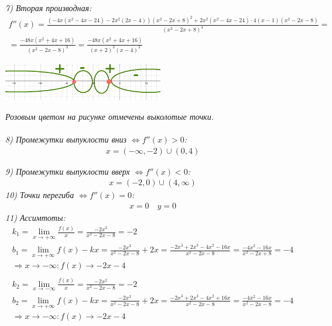 \documentclass[a4paper,11pt]{article}
\begin{document}
\noindent \textsl{7) Вторая производная:}
\begin{gather*}	
f''(x) = \frac{(-4x(x^2 - 4x - 24) - 2x^2(2x - 4))(x^2 - 2x + 8)^2 + 2x^2(x^2 - 4x - 24) \cdot 4(x - 1)(x^2 - 2x - 8) }{(x^2 - 2x + 8)^4} = \\
= \frac{-48x(x^2 + 4x + 16)}{(x^2 - 2x - 8)^3} = \frac{-48x(x^2 + 4x + 16)}{(x + 2)^3(x - 4)^3}
\end{gather*}

\begin{center}
	\includegraphics[width = 70mm]{images/723.png}
\end{center}
\noindent \textit{Розовым цветом на рисунке отмечены выколотые точки.} \\ \\
\noindent \textsl{8) Промежутки  выпуклости вниз $\Longleftrightarrow f''(x) > 0 $:}
\begin{gather*}
x = (-\infty, -2) \cup (0, 4)
\end{gather*}

\noindent \textsl{9) Промежутки  выпуклости вверх $\Longleftrightarrow f''(x) < 0 $:}
\begin{gather*}
 x = (-2, 0) \cup (4, \infty)
\end{gather*}
\noindent \textsl{10) Точки перегиба   $\Longleftrightarrow f''(x) = 0 $:}
\begin{align*}
x = 0 \quad y = 0
\end{align*}
\noindent \textsl{11) Ассимтоты:}
\begin{gather*}
k_1 = \lim_{x \to +\infty} \frac{f(x)}{x} = \frac{-2x^2}{x^2 - 2x - 8} = -2 \\
b_1 = \lim_{x \to +\infty} f(x) - kx = \frac{-2x^3}{x^2 - 2x - 8} + 2x = 
\frac{-2x^3 + 2x^3 - 4x^2 - 16x}{x^2 - 2x - 8} = \frac{- 4x^2 - 16x}{x^2 - 2x + 8} = -4 \\
\Rightarrow x \to -\infty: f(x) \to -2x - 4 \\ \\
k_2 = \lim_{x \to -\infty} \frac{f(x)}{x} = \frac{-2x^2}{x^2 - 2x - 8} = -2 \\
b_2 = \lim_{x \to +\infty} f(x) - kx = \frac{-2x^3}{x^2 - 2x - 8} + 2x = 
\frac{-2x^3 + 2x^3 - 4x^2 + 16x}{x^2 - 2x - 8} = \frac{- 4x^2 - 16x}{x^2 - 2x - 8} = -4 \\
\Rightarrow x \to -\infty: f(x) \to -2x - 4 
\end{gather*}
\newpage
\end{document}
